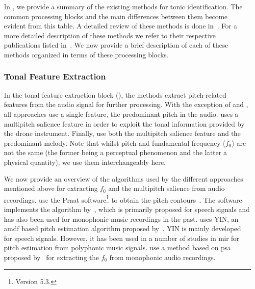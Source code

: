 In , we provide a summary of the existing methods for tonic identification. The common processing blocks and the main differences between them become evident from this table. A detailed review of these methods is done in~\cite{Gulati2014Tonic}. For a more detailed description of these methods we refer to their respective publications listed in~. We now provide a brief description of each of these methods organized in terms of these processing blocks.


\subsubsection{Tonal Feature Extraction}
\label{Feature Extraction}

In the tonal feature extraction block (), the methods extract pitch-related
features from the audio signal for further processing. With the exception of \cite{salamon2012multipitch} and \cite{gulati2012two}, all approaches use a single feature, the predominant pitch in the audio. \cite{salamon2012multipitch} uses a multipitch salience feature in order to exploit the tonal information provided by the drone instrument. Finally, \cite{gulati2012two} use both the multipitch salience feature and the predominant melody. Note that whilst pitch and fundamental frequency ($f_0$) are not the same (the former being a perceptual phenomenon and the latter a physical quantity), we use them interchangeably here.

We now provide an overview of the algorithms used by the different approaches mentioned above for extracting $f_0$ and the multipitch salience from audio recordings. \cite{ranjani2011carnatic} use the Praat software\footnote{Version 5.3.} to obtain the pitch contours~\citep{BoersmaPaul2001}. The software implements the algorithm by~\cite{boersma1993accurate}, which is primarily proposed for speech signals and has also been used for monophonic music recordings in the past. \cite{Ashwin_Istanbul2012} uses YIN, an \gls{amdf} based pitch estimation algorithm proposed by~\cite{DeCheveigne2002}. YIN is mainly developed for speech signals. However, it has been used in a number of studies in \gls{mir} for pitch estimation from polyphonic music signals. \cite{Sengupta2005b} use a method based on \gls{psa} proposed by~\cite{AKDatta_1996} for extracting the $f_0$ from monophonic audio recordings. %

